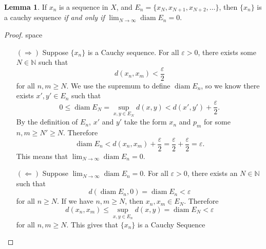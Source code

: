 \documentclass{article}
\newcommand{\N}{\mathbb{N}}
\DeclareMathOperator{\diam}{diam}
\theoremstyle{definition}
\newtheorem{lemma}{Lemma}[section]
\begin{document}
\begin{lemma}
	If $ x_n $ is a sequence in $ X $, and $ E_n=\{x_N,x_{N+1},x_{N+2},\ldots\} $, then $ \{x_n\} $ is a cauchy sequence \textit{if and only if} $ \lim_{N\to\infty}\diam E_n=0 $. 
\end{lemma}
\begin{proof}{\color{white}space}
	\begin{enumerate}
		\item [$ (\Longrightarrow) $] Suppose $ \{x_n\} $ is a Cauchy sequence.  For all $ \varepsilon>0 $, there exists some $ N\in\N $ such that $$d(x_n,x_m)<\frac{\varepsilon}{2} $$ for all $ n,m\ge N $. We use the supremum to define $ \diam E_n $, so we know there exists $ x',y'\in E_n $ such that $$0\le\diam E_N=\sup\limits_{x,y\in E_N}d(x,y)<d(x',y')+\frac{\varepsilon}{2} .$$ By the definition of $ E_n $, $ x' $ and $ y' $ take the form $ x_n $ and $ p_m $ for some $ n,m\ge N'\ge N $. Therefore $$\diam E_n<d(x_n,x_m)+\frac{\varepsilon}{2}=\frac{\varepsilon}{2}+\frac{\varepsilon}{2}=\varepsilon .$$ This means that  $ \lim_{N\to\infty}\diam E_n=0 $.
		\item [$ (\Longleftarrow) $] Suppose $ \lim_{N\to\infty}\diam E_n=0 $. For all $ \varepsilon>0 $, there exists an $ N\in\N $ such that $$ d(\diam E_n,0)=\diam E_n<\varepsilon$$ for all $ n\ge N $. If we have $ n,m\ge N $, then $ x_n,x_m\in E_N $. Therefore $$ d(x_n,x_m)\le\sup\limits_{x,y\in E_n}d(x,y)=\diam E_N<\varepsilon$$ for all $ n,m\ge N $. This gives that $ \{x_n\} $ is a Cauchy Sequence   
	\end{enumerate}
\end{proof}
\end{document}
